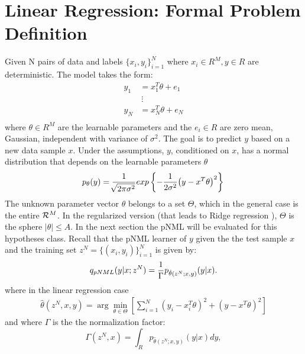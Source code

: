 \documentclass[conference,letterpaper]{IEEEtran}
\begin{document}
\section{Linear Regression: Formal Problem Definition} \label{sec:formal_problem_def}
Given N pairs of data and labels $\{x_i, y_i\}_{i=1}^{N}$ where $x_i \in R^M, y\in R$ are deterministic. The model takes the form:
\begin{equation}
\begin{split}
y_1&=x_1^T \theta + e_1 \\
   &\ \vdots \\
y_{N}&=x_{N}^T \theta + e_{N} \\
\end{split}
\end{equation}
where $\theta \in R^M$ are the learnable parameters and the $e_i \in R$ are zero mean, Gaussian, independent with variance of $\sigma^2$. 
The goal is to predict $y$ based on a new data sample $x$. 
Under the assumptions, $y$, conditioned on $x$, has a normal distribution that depends on the learnable parameters $\theta$ 
\begin{equation}
p_{\theta}(y) 
=\frac{1}{\sqrt[]{2\pi\sigma^2}}exp\left\{-\frac{1}{2\sigma^2}\big(y- x^T\theta \big)^2\right\}  \\
\end{equation}
The unknown parameter vector $\theta$ belongs to a set $\Theta$, which in the general case is the entire ${\cal R}^M$. In the regularized version (that leads to Ridge regression \cite{}), $\Theta$ is the sphere $|\theta|\leq A$. 
In the next section the pNML will be evaluated for this hypotheses class. 
Recall that the pNML learner of $y$ given the the test sample $x$ and the training set $z^N=\{(x_i,y_i)\}_{i=1}^{N}$ is given by:
\begin{equation} \label{eq:pNML_def}
q_{\mbox{\tiny{pNML}}}(y|x;z^N) = \frac{1}{\Gamma} p_{\hat{\theta}(z^N;x,y)}(y|x).
\end{equation}
where in the linear regression case 
\begin{align}
\hat{\theta}(z^N,x,y)= \arg\min_{\theta\in\Theta} \left[ \sum_{i=1}^N \left(y_i - x_i^T\theta \right)^2 + \left(y-x^T\theta\right)^2 \right]
\end{align}
and where  $\Gamma$ is the the normalization factor:
\begin{equation} \label{gamma}
\Gamma(z^N,x) = \int_R  p_{\hat{\theta}(z^N;x,y)}(y|x)dy,   
\end{equation}
\end{document}
